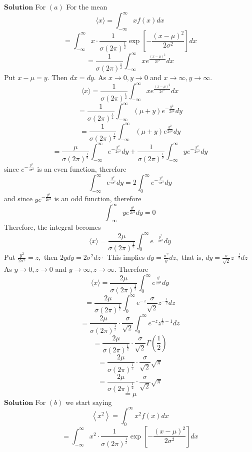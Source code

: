 \documentclass{styles/kaobook}
\begin{document}
$\boxed{\textbf{Solution}}$ For $(a)$ For the mean
$$
\langle x\rangle=\int_{-\infty}^{\infty} x f(x) d x
$$
$$
=\int_{-\infty}^{\infty} x \cdot \frac{1}{\sigma(2 \pi)^{\frac{1}{2}}} \exp \left[-\frac{(x-\mu)^{2}}{2 \sigma^{2}}\right] d x
$$
$$
=\frac{1}{\sigma(2 \pi)^{\frac{1}{2}}} \int_{-\infty}^{\infty} x e^{\frac{(x-\mu)^{2}}{2 \sigma^{2}}} d x
$$
Put $x-\mu=y .$ Then $d x=d y .$ As $x \rightarrow 0, y \rightarrow 0$ and $x \rightarrow \infty, y \rightarrow \infty$.
$$
\langle x\rangle=\frac{1}{\sigma(2 \pi)^{\frac{1}{2}}} \int_{-\infty}^{\infty} x e^{\frac{(x-\mu)^{2}}{2 \sigma^{2}}} d x
$$
$$
=\frac{1}{\sigma(2 \pi)^{\frac{1}{2}}} \int_{-\infty}^{\infty}(\mu+y) e^{-\frac{y^{2}}{2 \sigma^{2}}} d y
$$
$$
=\frac{1}{\sigma(2 \pi)^{\frac{1}{2}}} \int_{-\infty}^{\infty}(\mu+y) e^{\frac{y^{2}}{2 \sigma^{2}}} d y
$$
$$
=\frac{\mu}{\sigma(2 \pi)^{\frac{1}{2}}} \int_{-\infty}^{\infty} e^{-\frac{y^{2}}{2 \sigma^{2}}} d y+\frac{1}{\sigma(2 \pi)^{\frac{1}{2}}} \int_{-\infty}^{\infty} y e^{-\frac{y^{2}}{2 \sigma^{2}}} d y
$$
since $e^{-\frac{y^{2}}{2 \sigma^{2}}}$ is an even function, therefore 
$$\int_{-\infty}^{\infty} e^{\frac{y^{2}}{2 \sigma^{2}}} d y=2 \int_{0}^{\infty} e^{-\frac{y^{2}}{2 \sigma^{2}}} d y$$
and since $y e^{-\frac{y^{2}}{2 \sigma^{2}}}$ is an odd
function, therefore 
$$\int_{-\infty}^{\infty} y e^{\frac{y^{2}}{2 \sigma^{2}}} d y=0$$
Therefore, the integral becomes
$$
\langle x\rangle=\frac{2 \mu}{\sigma(2 \pi)^{\frac{1}{2}}} \int_{0}^{\infty} e^{-\frac{y^{2}}{2 \sigma^{2}}} d y
$$
Put $\frac{y^{2}}{2 \sigma^{2}}=z,$ then $2 y d y=2 \sigma^{2} d z \cdot$ This implies $d y=\frac{\sigma^{2}}{y} d z,$ that is, $d y=\frac{\sigma}{\sqrt{2}} z^{-\frac{1}{2}} d z$
As $y \rightarrow 0, z \rightarrow 0$ and $y \rightarrow \infty, z \rightarrow \infty$. Therefore
$$\langle x\rangle=\frac{2 \mu}{\sigma(2 \pi)^{\frac{1}{2}}} \int_{0}^{\infty} e^{\frac{y^{2}}{2 \sigma^{2}}} d y$$
$$=\frac{2 \mu}{\sigma(2 \pi)^{\frac{1}{2}}} \int_{0}^{\infty} e^{-z} \frac{\sigma}{\sqrt{2}} z^{-\frac{1}{2}} d z$$
$$=\frac{2 \mu}{\sigma(2 \pi)^{\frac{1}{2}}} \cdot \frac{\sigma}{\sqrt{2}} \int_{0}^{\infty} e^{-z} z^{\frac{1}{2}-1} d z$$
$$=\frac{2 \mu}{\sigma(2 \pi)^{\frac{1}{2}}} \cdot \frac{\sigma}{\sqrt{2}} \Gamma\left(\frac{1}{2}\right)$$
$$=\frac{2 \mu}{\sigma(2 \pi)^{\frac{1}{2}}} \cdot \frac{\sigma}{\sqrt{2}} \sqrt{\pi}$$
$$=\frac{2 \mu}{\sigma(2 \pi)^{\frac{1}{2}}} \cdot \frac{\sigma}{\sqrt{2}} \sqrt{\pi}$$
$$=\mu$$
$\boxed{\textbf{Solution}}$ For $(b)$ we start saying
$$
\left\langle x^{2}\right\rangle=\int_{0}^{\infty} x^{2} f(x) d x
$$
$$
=\int_{-\infty}^{\infty} x^{2} \cdot \frac{1}{\sigma(2 \pi)^{\frac{1}{2}}} \exp \left[-\frac{(x-\mu)^{2}}{2 \sigma^{2}}\right] d x
$$
\end{document}
